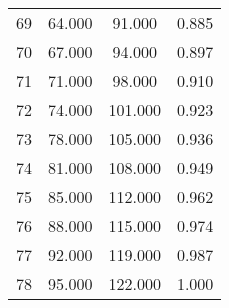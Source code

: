 \begin{tabular}{cccc}
  69 & 64.000 & 91.000 & 0.885 \\ 
  70 & 67.000 & 94.000 & 0.897 \\ 
  71 & 71.000 & 98.000 & 0.910 \\ 
  72 & 74.000 & 101.000 & 0.923 \\ 
  73 & 78.000 & 105.000 & 0.936 \\ 
  74 & 81.000 & 108.000 & 0.949 \\ 
  75 & 85.000 & 112.000 & 0.962 \\ 
  76 & 88.000 & 115.000 & 0.974 \\ 
  77 & 92.000 & 119.000 & 0.987 \\ 
  78 & 95.000 & 122.000 & 1.000 \\ 
   \hline
\end{tabular}
